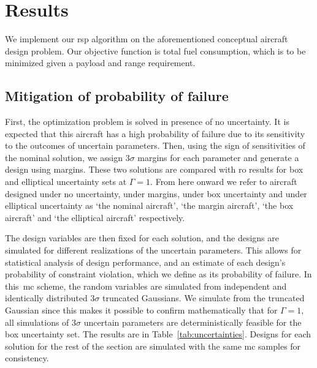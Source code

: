 \section{Results}

We implement our \gls{rsp} algorithm on the aforementioned conceptual aircraft design problem.
Our objective function is total fuel consumption, which is
to be minimized given a payload and range requirement.

\subsection{Mitigation of probability of failure}

First, the optimization problem is solved in presence of no uncertainty. It is expected
that this aircraft has a high probability of failure due to its sensitivity
to the outcomes of uncertain parameters. Then, using the sign of
sensitivities of the nominal solution, we assign $3\sigma$ margins for each parameter
and generate a design using margins. These two solutions are compared with \gls{ro} results for
box and elliptical uncertainty sets at $\Gamma = 1$. From here onward we refer to
aircraft designed under no uncertainty, under margins, under box uncertainty and
under elliptical uncertainty as `the nominal aircraft',
`the margin aircraft', `the box aircraft' and `the elliptical aircraft' respectively.

The design variables are then fixed for each solution, and the designs are simulated for
different realizations of the uncertain parameters.
This allows for statistical analysis of design performance, and
an estimate of each design's probability of constraint
violation, which we define as its probability of failure.
In this~\gls{mc} scheme, the random variables
are simulated from independent and identically distributed $3\sigma$ truncated Gaussians.
We simulate from the truncated Gaussian since this makes it possible to
confirm mathematically that for $\Gamma = 1$, all simulations of $3\sigma$ uncertain parameters are
deterministically feasible for the box uncertainty set. The results are in Table~\ref{tab:uncertainties}.
Designs for each solution for the rest of the section
are simulated with the same \gls{mc} samples for consistency.

